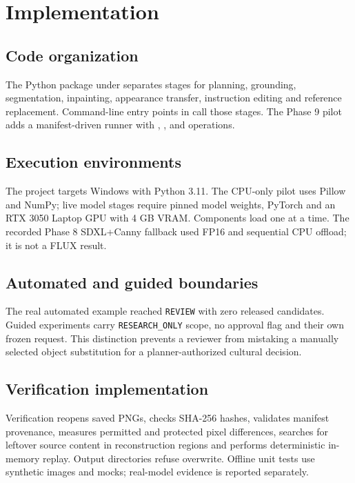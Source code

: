 \chapter{Implementation}
\label{ch:implementation}
\section{Code organization}
The Python package under  separates stages for planning, grounding, segmentation, inpainting, appearance transfer, instruction editing and reference replacement. Command-line entry points in  call those stages. The Phase 9 pilot adds a manifest-driven runner with , ,  and  operations.

\section{Execution environments}
The project targets Windows with Python 3.11. The CPU-only pilot uses Pillow and NumPy; live model stages require pinned model weights, PyTorch and an RTX 3050 Laptop GPU with 4 GB VRAM. Components load one at a time. The recorded Phase 8 SDXL+Canny fallback used FP16 and sequential CPU offload; it is not a FLUX result.

\section{Automated and guided boundaries}
The real automated example reached \texttt{REVIEW} with zero released candidates. Guided experiments carry \texttt{RESEARCH\_ONLY} scope, no approval flag and their own frozen request. This distinction prevents a reviewer from mistaking a manually selected object substitution for a planner-authorized cultural decision.

\section{Verification implementation}
Verification reopens saved PNGs, checks SHA-256 hashes, validates manifest provenance, measures permitted and protected pixel differences, searches for leftover source content in reconstruction regions and performs deterministic in-memory replay. Output directories refuse overwrite. Offline unit tests use synthetic images and mocks; real-model evidence is reported separately.
